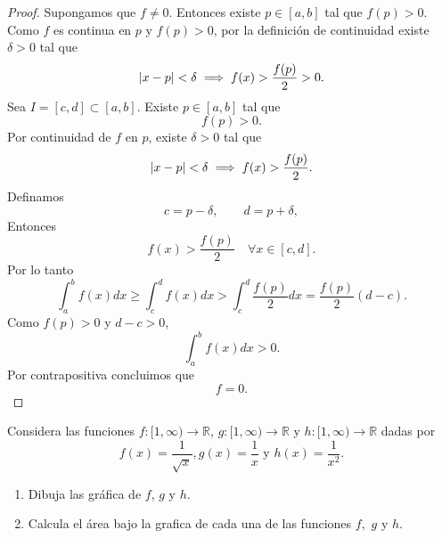 \documentclass[12pt,a4paper]{article}
\begin{document}
    \begin{proof}
        Supongamos que $f\neq0$. Entonces existe $p\in[a,b]$ tal que
        $f(p)\gt0$. Como $f$ es continua en $p$ y $f(p)\gt0$, por la definición
        de continuidad existe $\delta\gt0$ tal que
        \begin{equation*}
            \abs{x-p}<\delta\implies f(x)>\frac{f(p)}{2}>0.
        \end{equation*}
        Sea $I=[c,d]\subset[a,b]$. Existe $p\in[a,b]$ tal que
        \begin{equation*}
            f(p)\gt0.
        \end{equation*}
        Por continuidad de $f$ en $p$, existe $\delta\gt0$ tal que
        \begin{equation*}
            \abs{x-p}<\delta\implies f(x)>\frac{f(p)}{2}.
        \end{equation*}
        Definamos
        \begin{equation*}
            c=p-\delta,\qquad d=p+\delta,
        \end{equation*}
        Entonces
        \begin{equation*}
            f(x)\gt\frac{f(p)}{2}\quad\forall x\in[c,d].
        \end{equation*}
        Por lo tanto
        \begin{equation*}
            \int_{a}^{b}f(x)dx\geq\int_{c}^{d}f(x)dx\gt\int_{c}^{d}\frac{f(p)}{2}dx=\frac{f(p)}{2}(d-c).
        \end{equation*}
        Como $f(p)\gt0$ y $d-c\gt0$,
        \begin{equation*}
            \int_{a}^{b}f(x)dx\gt0.
        \end{equation*}
        Por contrapositiva concluimos que
        \begin{equation*}
            f=0.
        \end{equation*}
    \end{proof}

    \begin{mdframed}[style=mdbluebox,frametitle={Ejercicio 2}]
        Considera las funciones $f:[1,\infty)\to\mathbb{R}$, $g:[1,\infty)\to\mathbb{R}$
        y $h:[1,\infty)\to\mathbb{R}$ dadas por
        \begin{equation*}
            f(x)=\frac{1}{\sqrt{x}}, g(x)=\frac{1}{x}\text{ y } h(x)=\frac{1}{x^{2}}.
        \end{equation*}
        \begin{enumerate}
            \item[(a)] Dibuja las gráfica de $f$, $g$ y $h$.
            \item[(b)] Calcula el área bajo la grafica de cada una de las funciones $f,$ $g$ y $h$.
        \end{enumerate}
    \end{mdframed}
\end{document}
